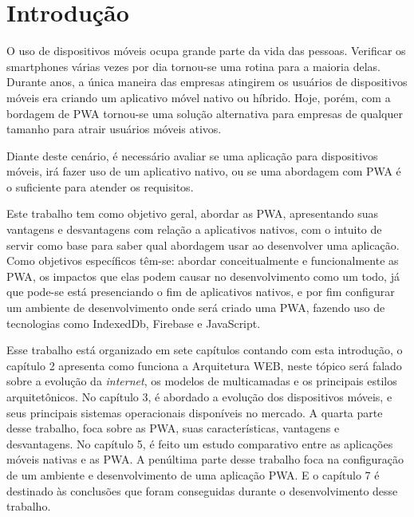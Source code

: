 
\chapter{{\Large\textbf{Introdução}}}

O uso de dispositivos móveis ocupa grande parte da vida das pessoas. Verificar os smartphones várias vezes por dia tornou-se uma rotina para a maioria delas. Durante anos, a única maneira das empresas atingirem os usuários de dispositivos móveis era criando um aplicativo móvel nativo ou híbrido. Hoje, porém, com a bordagem de \ac{PWA} tornou-se uma solução alternativa para empresas de qualquer tamanho para atrair usuários móveis ativos.


Diante deste cenário, é necessário avaliar se uma aplicação para dispositivos móveis, irá fazer uso de um aplicativo nativo, ou se uma abordagem com \ac{PWA} é o suficiente para atender os requisitos.

Este trabalho tem como objetivo geral, abordar as \ac{PWA}, apresentando suas vantagens e desvantagens com relação a aplicativos nativos, com o intuito de  servir como base para saber qual abordagem usar ao desenvolver uma aplicação. Como objetivos específicos têm-se:  abordar conceitualmente e funcionalmente as \ac{PWA},
os impactos que elas podem causar no desenvolvimento como um todo, já que pode-se está presenciando o fim de aplicativos nativos, e por fim configurar um ambiente de desenvolvimento onde será criado uma \ac{PWA}, fazendo uso de tecnologias como IndexedDb, Firebase e JavaScript.

Esse trabalho está organizado em sete capítulos contando com esta introdução,
o capítulo 2 apresenta como funciona a Arquitetura WEB, neste tópico será falado sobre a evolução da \textit{internet}, os modelos de multicamadas e os principais estilos arquitetônicos. No capítulo 3, é abordado a  evolução dos dispositivos móveis, e seus principais sistemas operacionais disponíveis no mercado.  A quarta parte desse trabalho, foca sobre as \ac{PWA}, suas características, vantagens e desvantagens. No capítulo 5, é feito um estudo comparativo entre as aplicações móveis nativas e as {PWA}. A penúltima parte desse trabalho foca na  configuração de um ambiente  e desenvolvimento de uma aplicação \ac{PWA}.
E  o capítulo 7 é destinado às conclusões que foram conseguidas durante o desenvolvimento desse trabalho.

